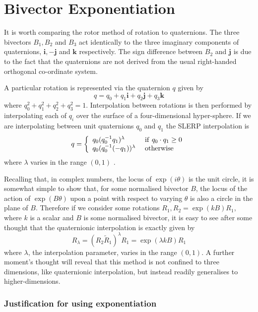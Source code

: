 
\chapter{Bivector Exponentiation}

It is worth comparing the rotor method of rotation to quaternions. The three bivectors
$B_1,B_2$ and $B_3$ act identically to the three imaginary components of quaternions,
$\mathbf{i}, -\mathbf{j}$ and $\mathbf{k}$ respectively. The sign difference 
between $B_2$ and $\mathbf{j}$ is due to the fact that the quaternions are not derived from the usual 
right-handed orthogonal co-ordinate system.

A particular rotation is represented via the quaternion $q$ given by
\[
q = q_0 + q_1 \mathbf{i} + q_2 \mathbf{j} + q_3 \mathbf{k}
\]
where $q_0^2 + q_1^2 + q_2^2 + q_3^2 = 1$. Interpolation between rotations is then
performed by interpolating each of $q_i$ over the surface of a four-dimensional
hyper-sphere. If we are interpolating between unit quaternions
$q_0$ and $q_1$ the SLERP interpolation is
\[
q = \left\{ 
\begin{array}{ll}
q_0(q_0^{-1}q_1)^\lambda & {\rm ~if~} q_0 \cdot q_1 \ge 0 \\
q_0(q_0^{-1}(-q_1))^\lambda & {\rm ~otherwise}
\end{array}
\right.
\]
where $\lambda$ varies in the range $(0,1)$ \cite{slerp}.

Recalling that, in complex numbers, the locus of $\exp(i\theta)$ is the unit
circle, it is somewhat simple to show that, for some normalised
bivector $B$, the locus of the action of $\exp(B\theta)$ upon a point with respect to varying 
$\theta$ is also a circle in the plane of $B$. Therefore if we consider
some rotations $R_1, R_2 = \exp(kB)R_1$, where $k$ is a scalar and
$B$ is some normalised bivector, it is easy to see after some thought that 
the quaternionic interpolation is exactly given by
\[
R_\lambda = (R_2 \tilde{R}_1)^\lambda R_1 = \exp(\lambda kB) R_1
\]
where $\lambda$, the interpolation parameter, varies in the range $(0,1)$. A further
moment's thought will reveal that this method is not confined to three dimensions, like
quaternionic interpolation, but instead readily generalises to higher-dimensions.

\subsection{Justification for using exponentiation}

